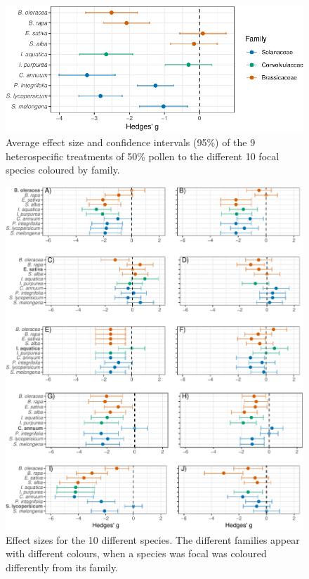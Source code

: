 \documentclass[11pt,a4paper]{article}
\begin{document}
\begin{figure}
\centering
\includegraphics{output/figures/unnamed-chunk-4-1.pdf}
\caption{Average effect size and confidence intervals (95\%) of the 9
heterospecific treatments of 50\% pollen to the different 10 focal
species coloured by family.}
\end{figure}

\newpage

\begin{figure}
\centering
\includegraphics{output/figures/unnamed-chunk-5-1.pdf}
\caption{Effect sizes for the 10 different species. The different
families appear with different colours, when a species was focal was
coloured differently from its family.}
\end{figure}
\end{document}

